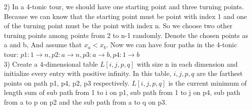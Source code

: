 \documentclass[12pt,letterpaper]{article}
\begin{document}
2) In a 4-tonic tour, we should have one starting point and three turning points. Because we can know that the starting point must be point with index 1 and one of the turning point must be the point with index n. So we choose two other turning points among points from 2 to n-1 randomly. Denote the chosen points as a and b, And assume that $x_{a}<x_{b}$. Now we can have four paths in the 4-tonic tour: $p1: 1 \to n, p2: a \to n, p3: a \to b, p4: 1 \to b$ \\

3) Create a 4-dimensional table $L[i,j,p,q]$ with size n in each dimension and initialize every entry with positive infinity. In this table, $i,j,p,q$ are the farthest points on path p1, p4, p2, p3 respectively. $L[i,j,p,q]$ is the current minimum of length sum of sub path from 1 to i on p1, sub path from 1 to j on p4, sub path from a to p on p2 and the sub path from a to q on p3. \\
\end{document}
